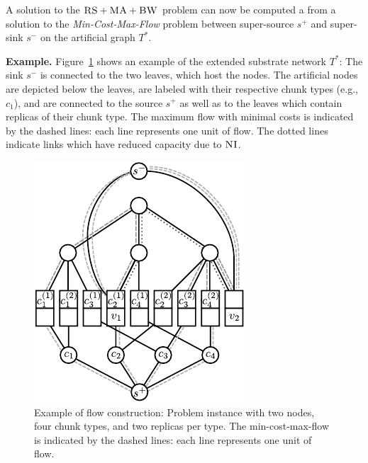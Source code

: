 \documentclass[conference,10pt]{IEEEtran}
\newcommand{\Source}{\ensuremath{s^{+}}}
\newcommand{\Sink}{\ensuremath{s^{-}}}
\newcommand{\achunk}{\ensuremath{c}}
\newcommand{\CC}{\textsc{NI}}
\newcommand{\FP}{\textsc{FP}}
\newcommand{\RS}{\textsc{RS}}
\newcommand{\BW}{\textsc{BW}}
\newcommand{\MA}{\textsc{MA}}
\newcommand{\Tree}{\ensuremath{T}}
\begin{document}
A solution to the $\RS+\MA+\BW$ problem can now be computed
a from a solution to the \emph{Min-Cost-Max-Flow} problem between super-source
$\Source$ and
super-sink $\Sink$ on the artificial graph $\Tree^*$.

\textbf{Example.} Figure~\ref{fig:flow_construction} shows an example of the extended substrate
network $\Tree^*$: The sink $\Sink$ is connected to the two leaves, which host the
nodes. The artificial nodes are depicted below the leaves, are labeled with
their respective chunk types (e.g., $\achunk_1$), and are connected to the source
$\Source$ as well as to the leaves which contain replicas of their chunk type.
The
maximum flow with minimal costs is indicated by the dashed lines: each line
represents one unit of flow. The dotted lines indicate links which have reduced
capacity due to $\CC$.

\begin{figure}
\centering
\includegraphics[width=0.8\columnwidth]{figs/flow_ma_cv}
\vspace{-1em}
\caption{Example of flow construction: Problem instance with two nodes, four chunk
types, and two replicas per type. The min-cost-max-flow
is indicated by the dashed lines: each line represents one unit of flow.
}
\vspace{-1em}
\label{fig:flow_construction}
\end{figure}
\end{document}
